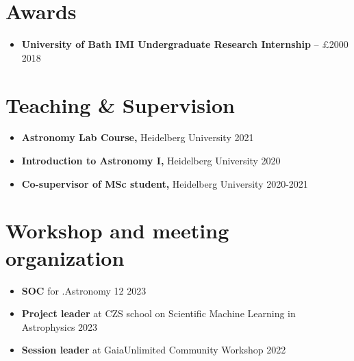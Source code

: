 \documentclass[12pt, letterpaper]{hunt-cv}
\begin{document}
\section*{Awards}

\begin{itemize}
    \item \textbf{University of Bath IMI Undergraduate Research Internship} -- £2000 \hfill 2018\\
\end{itemize}


\section*{Teaching \& Supervision}

\begin{itemize}
    \item \textbf{Astronomy Lab Course,} Heidelberg University \hfill 2021
    \item \textbf{Introduction to Astronomy I,} Heidelberg University \hfill 2020
    \item \textbf{Co-supervisor of MSc student,} Heidelberg University \hfill 2020-2021
\end{itemize}


\section*{Workshop and meeting organization}

\begin{itemize}
    \item \textbf{SOC} for .Astronomy 12 \hfill 2023
    \item \textbf{Project leader} at CZS school on Scientific Machine Learning in Astrophysics \hfill 2023
    \item \textbf{Session leader} at GaiaUnlimited Community Workshop \hfill 2022
\end{itemize}



\end{document}
